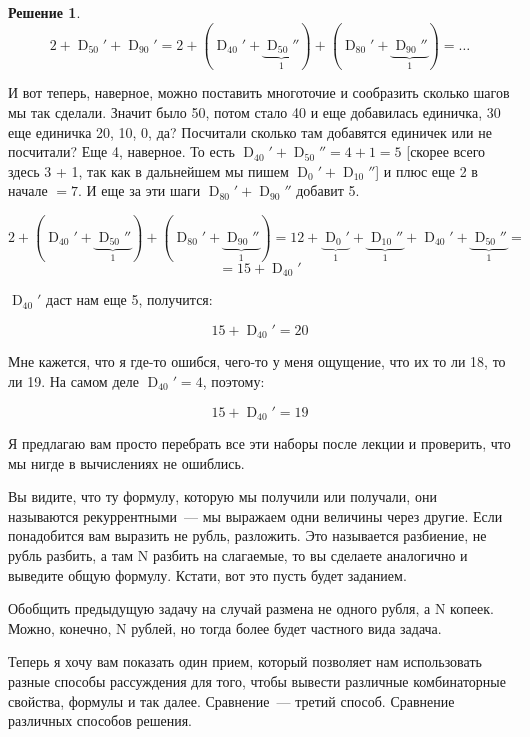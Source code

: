 \documentclass[russian]{lecture-notes}
\theoremstyle{definition}
\newtheorem*{solution}{Решение}
\DeclareMathOperator{\KRAZ}{D}
\newcommand{\DN}[1]{\KRAZ_{#1}}
\begin{document}
\begin{enumerate}
\begin{solution}
			 \[
			 	2 + \DN{50}' + \DN{90}' = 2 + (\DN{40}' + \underbrace{\DN{50}''}_{1}) + (\DN{80}' + \underbrace{\DN{90}''}_{1}) = \ldots
			 \]
			 
			 И вот теперь, наверное, можно поставить многоточие и сообразить сколько шагов мы так сделали. Значит было 50, потом стало 40 и еще добавилась единичка, 30 еще единичка 20, 10, 0, да? Посчитали сколько там добавятся единичек или не посчитали? Еще 4, наверное. То есть $\DN{40}' + \DN{50}'' = 4 + 1 = 5$ [скорее всего здесь 3 + 1, так как в дальнейшем мы пишем $\DN{0}' + \DN{10}''$] и плюс еще 2 в начале $=7$. И еще за эти шаги $\DN{80}' + \DN{90}''$ добавит 5.
			 
			 \[
			 	2 + (\DN{40}' + \underbrace{\DN{50}''}_{1}) + (\DN{80}' + \underbrace{\DN{90}''}_{1}) = 12 + \underbrace{\DN{0}'}_{1} + \underbrace{\DN{10}''}_{1} + \DN{40}' + \underbrace{\DN{50}''}_{1} =
			 \]
			 \[
			 	= 15 + \DN{40}'
			 \]
			 
			 $\DN{40}'$ даст нам еще 5, получится:
			 
			 \[
			 	15 + \DN{40}' = 20
			 \]
			 
			 Мне кажется, что я где-то ошибся, чего-то у меня ощущение, что их то ли 18, то ли 19. На самом деле $\DN{40}' = 4$, поэтому:
			 
			 \[
			 	15 + \DN{40}' = 19
			 \]
			 
			 Я предлагаю вам просто перебрать все эти наборы после лекции и проверить, что мы нигде в вычислениях не ошиблись.
			
		\end{solution}
	
		Вы видите, что ту формулу, которую мы получили или получали, они называются рекуррентными~--- мы выражаем одни величины через другие. Если понадобится вам выразить не рубль, разложить. Это называется разбиение, не рубль разбить, а там N разбить на слагаемые, то вы сделаете аналогично и выведите общую формулу. Кстати, вот это пусть будет заданием.
		
		
		\begin{problem}
			Обобщить предыдущую задачу на случай размена не одного рубля, а N копеек. Можно, конечно, N рублей, но тогда более будет частного вида задача.
		\end{problem}
	
		Теперь я хочу вам показать один прием, который позволяет нам использовать разные способы рассуждения для того, чтобы вывести различные комбинаторные свойства, формулы и так далее. Сравнение~--- третий способ. Сравнение различных способов решения.
		

\end{enumerate}
\end{document}
